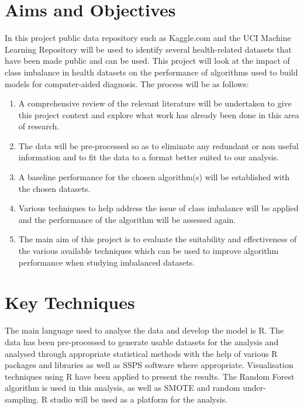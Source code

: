 \section{Aims and Objectives}
In this project public data repository such as Kaggle.com and the UCI Machine Learning Repository will be used to identify several health-related datasets that have been made public and can be used. This project will look at the impact of class imbalance in health datasets on the performance of algorithms used to build models for computer-aided diagnosis. The process will be as follows:
\begin{enumerate}
    \item A comprehensive review of the relevant literature will be undertaken to give this project context and explore what work has already been done in this area of research.
    
    \item The data will be pre-processed so as to eliminate any redundant or non useful information and to fit the data to a format better suited to our analysis.
    
    \item A baseline performance for the chosen algorithm(s) will be established with the chosen datasets.
    
    \item Various techniques to help address the issue of class imbalance will be applied and the performance of the algorithm will be assessed again.
    
    \item The main aim of this project is to evaluate the suitability and effectiveness of the various available techniques which can be used to improve algorithm performance when studying imbalanced datasets.
  
\end{enumerate}

\section{Key Techniques}
The main language used to analyse the data and develop the model is R.
The data has been pre-processed to generate usable datasets for the analysis and analysed through appropriate statistical methods with the help of various R packages and libraries as well as SSPS software where appropriate.\newline
Visualisation techniques using R have been applied to present the results. The Random Forest algorithm is used in this analysis, as well as SMOTE and random under-sampling. \newline
R studio will be used as a platform for the analysis.\newline

